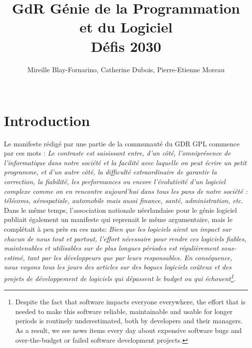 \documentclass[11pt]{article}
\title{GdR Génie de la Programmation et du Logiciel\\ 
Défis 2030}
\author{Mireille Blay-Fornarino, Catherine Dubois, Pierre-Etienne Moreau\\
\\
}
\begin{document}
\maketitle

\section{Introduction}

Le manifeste rédigé par une partie de la communauté du GDR GPL commence par ces mots : \emph{Le contraste est saisissant entre, d’un côté, l’omniprésence de l’informatique dans notre
société et la facilité avec laquelle on peut écrire un petit programme, et d’un autre côté, la difficulté extraordinaire de garantir la correction, la fiabilité, les performances ou encore
l’évolutivité d’un logiciel complexe comme on en rencontre aujourd’hui dans tous les pans
de notre société : télécoms, aérospatiale, automobile mais aussi finance, santé,
administration, etc}\cite{Manifeste}.
Dans le même temps, l'association nationale néerlandaise pour le génie logiciel publiait également un manifeste \cite{Nederland2019} qui reprenait le même argumentaire, mais le complétait à peu près en ces mots:  \emph{Bien que les logiciels aient un impact sur chacun de nous tout et partout, l'effort nécessaire pour rendre ces logiciels fiables, maintenables et utilisables sur de plus longues périodes est régulièrement sous-estimé, tant par les développeurs que par leurs responsables. En conséquence, nous voyons tous les jours des articles sur des bogues logiciels coûteux et des projets de développement de logiciels qui dépassent le budget ou qui échouent\footnote{Despite the fact that software impacts everyone everywhere, the effort that is needed to make this software reliable,
maintainable and usable for longer periods is routinely underestimated, both by developers and their managers. As a result,
we see news items every day about expensive software bugs and over-the-budget or failed software development projects\cite{Nederland2019}.}.}
\end{document}
